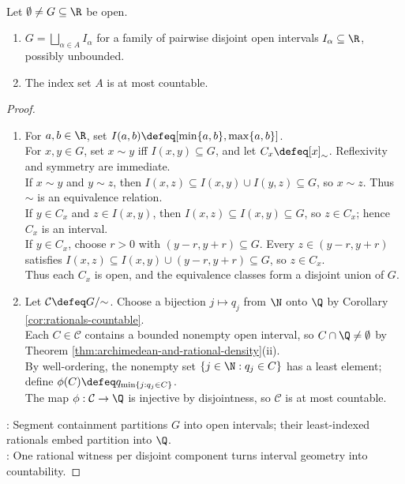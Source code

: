 \begin{theorem} \label{thm:real-open-set-disjoint-interval-decomposition} \\
Let $\emptyset\neq G\subseteq\R$ be open.
\begin{enumerate}[label=(\roman*)]
\setlength{\itemsep}{0pt}
\item $G=\bigsqcup\limits_{\alpha\in A}I_\alpha$ for a family of pairwise disjoint open intervals $I_\alpha\subseteq\R$, possibly unbounded.
\item The index set $A$ is at most countable.
\end{enumerate}
\begin{proof}
\begin{enumerate}[label=(\roman*)]
\setlength{\itemsep}{0pt}
\item For $a,b\in\R$, set $I(a,b)\defeq[\min\{a,b\},\max\{a,b\}]$.\\
For $x,y\in G$, set $x\sim y$ iff $I(x,y)\subseteq G$, and let $C_x\defeq[x]_\sim$. Reflexivity and symmetry are immediate.\\
If $x\sim y$ and $y\sim z$, then $I(x,z)\subseteq I(x,y)\cup I(y,z)\subseteq G$, so $x\sim z$. Thus $\sim$ is an equivalence relation.\\
If $y\in C_x$ and $z\in I(x,y)$, then $I(x,z)\subseteq I(x,y)\subseteq G$, so $z\in C_x$; hence $C_x$ is an interval.\\
If $y\in C_x$, choose $r>0$ with $(y-r,y+r)\subseteq G$. Every $z\in(y-r,y+r)$ satisfies $I(x,z)\subseteq I(x,y)\cup(y-r,y+r)\subseteq G$, so $z\in C_x$.\\
Thus each $C_x$ is open, and the equivalence classes form a disjoint union of $G$.
\item Let $\mathcal C\defeq G/{\sim}$. Choose a bijection $j\mapsto q_j$ from $\N$ onto $\Q$ by Corollary \ref{cor:rationals-countable}.\\
Each $C\in\mathcal C$ contains a bounded nonempty open interval, so $C\cap\Q\neq\emptyset$ by Theorem \ref{thm:archimedean-and-rational-density}(ii).\\
By well-ordering, the nonempty set $\{j\in\N:q_j\in C\}$ has a least element; define $\phi(C)\defeq q_{\min\{j:q_j\in C\}}$.\\
The map $\phi:\mathcal C\to\Q$ is injective by disjointness, so $\mathcal C$ is at most countable.
\end{enumerate}
: Segment containment partitions $G$ into open intervals; their least-indexed rationals embed partition into $\Q$.\\
: One rational witness per disjoint component turns interval geometry into countability.
\end{proof}
\end{theorem}

